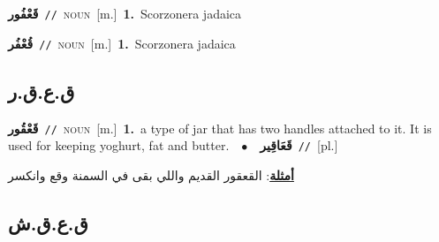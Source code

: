 \documentclass[10pt,a4paper,twoside]{article} %
\begin{document}
\begin{multicols}{2}
{\setlength\topsep{0pt}\textbf{\foreignlanguage{arabic}{قَعْفُور}}\ {\color{gray}\texttt{//}\color{black}}\ \textsc{noun}\ [m.]\ \textbf{1.}~Scorzonera jadaica\ } \vspace{2mm}

{\setlength\topsep{0pt}\textbf{\foreignlanguage{arabic}{قُعْفُر}}\ {\color{gray}\texttt{//}\color{black}}\ \textsc{noun}\ [m.]\ \textbf{1.}~Scorzonera jadaica\ } \vspace{2mm}

\vspace{-3mm}
\subsection*{\color{blue}\foreignlanguage{arabic}{ق.ع.ق.ر}\color{blue}{}} 

{\setlength\topsep{0pt}\textbf{\foreignlanguage{arabic}{قَعْقُور}}\ {\color{gray}\texttt{//}\color{black}}\ \textsc{noun}\ [m.]\ \textbf{1.}~a type of jar that has two handles attached to it. It is used for keeping yoghurt, fat and butter.\ \ $\bullet$\ \ \setlength\topsep{0pt}\textbf{\foreignlanguage{arabic}{قَعَاقِير}}\ {\color{gray}\texttt{//}\color{black}}\ [pl.]\  \begin{flushright}\color{gray}\foreignlanguage{arabic}{\textbf{\underline{\foreignlanguage{arabic}{أمثلة}}}: القعقور القديم واللي بقى في السمنة وقع  وانكسر}\end{flushright}\color{black}} \vspace{2mm}

\vspace{-3mm}
\subsection*{\color{blue}\foreignlanguage{arabic}{ق.ع.ق.ش}\color{blue}{}} 


\end{multicols}
\end{document}
